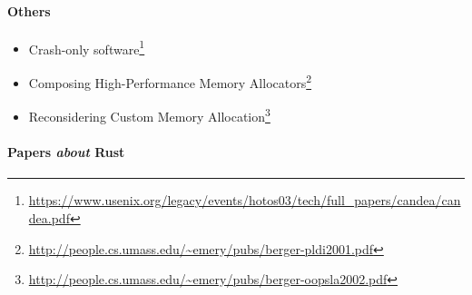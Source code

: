 \documentclass[a4paper,]{book}
\renewcommand{\href}[2]{#2\footnote{\url{#1}}}
\providecommand{\tightlist}{%
  \setlength{\itemsep}{0pt}\setlength{\parskip}{0pt}}
\let\oldparagraph\paragraph
\renewcommand{\paragraph}[1]{\oldparagraph{#1}\mbox{}}
\begin{document}
\paragraph{Others}\label{others}

\begin{itemize}
\tightlist
\item
  \href{https://www.usenix.org/legacy/events/hotos03/tech/full_papers/candea/candea.pdf}{Crash-only
  software}
\item
  \href{http://people.cs.umass.edu/~emery/pubs/berger-pldi2001.pdf}{Composing
  High-Performance Memory Allocators}
\item
  \href{http://people.cs.umass.edu/~emery/pubs/berger-oopsla2002.pdf}{Reconsidering
  Custom Memory Allocation}
\end{itemize}

\paragraph{\texorpdfstring{Papers \emph{about}
Rust}{Papers about Rust}}\label{papers-about-rust}
\end{document}
